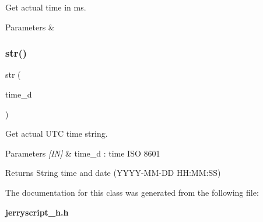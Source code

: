 Get actual time in ms. 


\begin{DoxyCode}{0}
\end{DoxyCode}



\begin{DoxyParams}{Parameters}
{\em } & \\
\hline
\end{DoxyParams}
\mbox{\label{classtime_a582e9110fc17ab45f9b815eadbe15c10}} 
\subsubsection{str()}
{\footnotesize\ttfamily str (\begin{DoxyParamCaption}\item[{time\+\_\+d}]{ }\end{DoxyParamCaption})}



Get actual U\+TC time string. 


\begin{DoxyCode}{0}
\end{DoxyCode}



\begin{DoxyParams}{Parameters}
{\em \mbox{[}\+I\+N\mbox{]}} & time\+\_\+d \+: time I\+SO 8601 \\
\hline
\end{DoxyParams}
\begin{DoxyReturn}{Returns}
String time and date (Y\+Y\+Y\+Y-\/\+M\+M-\/\+DD H\+H\+:\+MM\+:SS) 
\end{DoxyReturn}


The documentation for this class was generated from the following file\+:\begin{DoxyCompactItemize}
\item 
\textbf{ jerryscript\+\_\+h.\+h}\end{DoxyCompactItemize}
